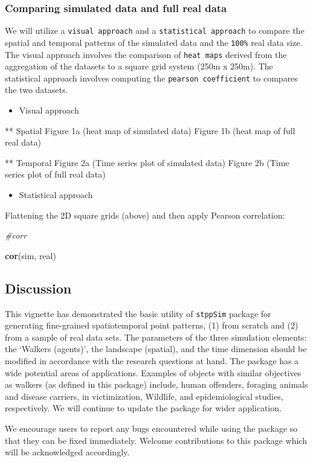 \documentclass[
  16pt,
]{article}
\newenvironment{Shaded}{\begin{snugshade}}{\end{snugshade}}
\newcommand{\CommentTok}[1]{\textcolor[rgb]{0.56,0.35,0.01}{\textit{#1}}}
\newcommand{\KeywordTok}[1]{\textcolor[rgb]{0.13,0.29,0.53}{\textbf{#1}}}
\newcommand{\NormalTok}[1]{#1}
\providecommand{\tightlist}{%
  \setlength{\itemsep}{0pt}\setlength{\parskip}{0pt}}
\begin{document}
\hypertarget{comparing-simulated-data-and-full-real-data}{%
\subsubsection{Comparing simulated data and full real
data}\label{comparing-simulated-data-and-full-real-data}}

We will utilize a \texttt{visual\ approach} and a
\texttt{statistical\ approach} to compare the spatial and temporal
patterns of the simulated data and the \texttt{100\%} real data size.
The visual approach involves the comparison of \texttt{heat\ maps}
derived from the aggregation of the datasets to a square grid system
(250m x 250m). The statistical approach involves computing the
\texttt{pearson\ coefficient} to compares the two datasets.

\begin{itemize}
\tightlist
\item
  Visual approach
\end{itemize}

** Spatial Figure 1a (heat map of simulated data) Figure 1b (heat map of
full real data)

** Temporal Figure 2a (Time series plot of simulated data) Figure 2b
(Time series plot of full real data)

\begin{itemize}
\tightlist
\item
  Statistical approach
\end{itemize}

Flattening the 2D square grids (above) and then apply Pearson
correlation:

\begin{Shaded}
\begin{Highlighting}[]
\CommentTok{\#corr}

\KeywordTok{cor}\NormalTok{(sim, real)}
\end{Highlighting}
\end{Shaded}

\hypertarget{discussion}{%
\subsection{Discussion}\label{discussion}}

This vignette has demonstrated the basic utility of \texttt{stppSim}
package for generating fine-grained spatiotemporal point patterns, (1)
from scratch and (2) from a sample of real data sets. The parameters of
the three simulation elements: the `Walkers (agents)', the landscape
(spatial), and the time dimension should be modified in accordance with
the research questions at hand. The package has a wide potential areas
of applications. Examples of objects with similar objectives as walkers
(as defined in this package) include, human offenders, foraging animals
and disease carriers, in victimization, Wildlife, and epidemiological
studies, respectively. We will continue to update the package for wider
application.

We encourage users to report any bugs encountered while using the
package so that they can be fixed immediately. Welcome contributions to
this package which will be acknowledged accordingly.
\end{document}

